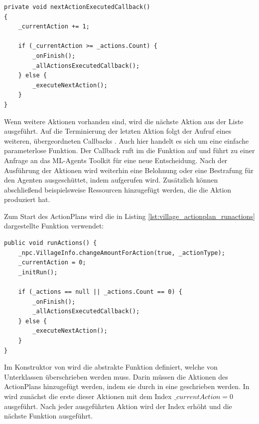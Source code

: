 \begin{minipage}{\linewidth}
\begin{lstlisting}[linewidth=16.4cm, label=lst:village_actionplan_single_action_callback, caption=ActionPlan-Callback, xleftmargin=1cm]
private void nextActionExecutedCallback()
{
    _currentAction += 1;

    if (_currentAction >= _actions.Count) {
        _onFinish();
        _allActionsExecutedCallback();
    } else {
        _executeNextAction();
    }
}
\end{lstlisting}
\end{minipage}

Wenn weitere Aktionen vorhanden sind, wird die nächste Aktion aus der Liste ausgeführt. Auf die Terminierung der letzten Aktion folgt der Aufruf eines weiteren, übergeordneten Callbacks . Auch hier handelt es sich um eine einfache parameterlose Funktion. Der Callback ruft im  die Funktion  auf und führt zu einer Anfrage an das ML-Agents Toolkit für eine neue Entscheidung. Nach der Ausführung der Aktionen wird weiterhin eine Belohnung oder eine Bestrafung für den Agenten ausgeschüttet, indem  aufgerufen wird. Zusätzlich können abschließend beispielsweise Ressourcen hinzugefügt werden, die die Aktion produziert hat.

Zum Start des ActionPlans wird die in Listing \ref{lst:village_actionplan_runactions} dargestellte Funktion  verwendet:

\begin{minipage}{\linewidth}
\begin{lstlisting}[linewidth=16.4cm, label=lst:village_actionplan_runactions, caption=Starten eines ActionPlans, xleftmargin=1cm]
public void runActions() {
    _npc.VillageInfo.changeAmountForAction(true, _actionType);
    _currentAction = 0;
    _initRun();

    if (_actions == null || _actions.Count == 0) {
        _onFinish();
        _allActionsExecutedCallback();
    } else {
        _executeNextAction();
    }
}
\end{lstlisting}
\end{minipage}

Im Konstruktor von  wird die abstrakte Funktion  definiert, welche von Unterklassen überschrieben werden muss. Darin müssen die Aktionen des ActionPlans hinzugefügt werden, indem sie durch  in eine  geschrieben werden. In  wird zunächst die erste dieser Aktionen mit dem Index $\_currentAction = 0$ ausgeführt. Nach jeder ausgeführten Aktion wird der Index erhöht und die nächste Funktion ausgeführt.

